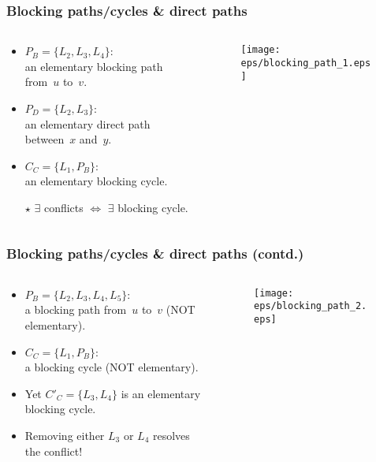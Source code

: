 \documentclass[xcolor=dvipsnames,envcountsect,handout]{beamer}
\begin{document}
\begin{frame}
\frametitle{Blocking paths/cycles \& direct paths}
\vspace{-6pt}
\begin{columns}
\begin{column}[t]{6cm}
\begin{itemize}
\item $P_B = \{L_2,L_3,L_4\}$: \\an \alert{elementary} blocking path 
from~$u$ to~$v$. 
\vspace{6pt}
\item $P_D = \{L_2,L_3\}$: \\an \alert{elementary} direct path 
between~$x$ and~$y$.
\vspace{6pt}
\item $C_C = \{L_1,P_B\}$: \\an \alert{elementary} blocking cycle.
\vspace{6pt}
\item [$\star$] $\exists$ conflicts $\Leftrightarrow$ $\exists$ 
blocking cycle. 
\end{itemize}
\end{column}
\begin{column}[t]{6cm}
\vspace{-8pt}
\begin{figure}[H]
\centering
\texttt{[image: eps/blocking\_path\_1.eps]}
\end{figure}
\end{column}
\end{columns}
\end{frame}


\begin{frame}
\frametitle{Blocking paths/cycles \& direct paths (contd.)}
\vspace{-6pt}
\begin{columns}
\begin{column}[t]{6cm}
\begin{itemize}
\item $P_B = \{L_2,L_3,L_4,L_5\}$: \\a blocking path from~$u$ to~$v$
(NOT elementary). 
\vspace{6pt}
\item $C_C = \{L_1,P_B\}$: \\a blocking cycle (NOT elementary).
\vspace{6pt}
\item Yet $C'_C = \{L_3,L_4\}$ is an \alert{elementary} blocking 
cycle. 
\vspace{6pt}
\item Removing either $L_3$ or $L_4$ resolves the conflict!
\end{itemize}
\end{column}
\begin{column}[t]{6cm}
\vspace{-8pt}
\begin{figure}[H]
\centering
\texttt{[image: eps/blocking\_path\_2.eps]}
\end{figure}
\end{column}
\end{columns}
\end{frame}
\end{document}
